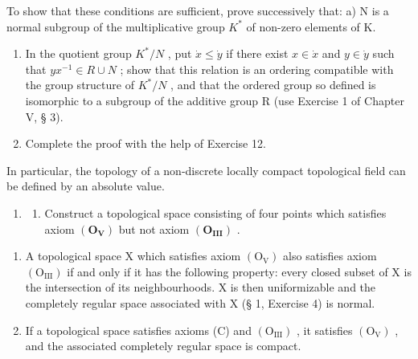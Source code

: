 To show that these conditions are sufficient, prove successively that: a) N is a normal subgroup of the multiplicative group \(K^{*}\) of non-zero elements of K.

\begin{enumerate}
\def\labelenumi{\alph{enumi})}
\setcounter{enumi}{1}
\item
  In the quotient group \(K^{*}/N\) , put \(\dot{x} \leqslant \dot{y}\) if there exist \(x \in \dot{x}\) and \(y \in \dot{y}\) such that \(yx^{-1} \in R \cup N\) ; show that this relation is an ordering compatible with the group structure of \(K^{*}/N\) , and that the ordered group so defined is isomorphic to a subgroup of the additive group R (use Exercise 1 of Chapter V, § 3).
\item
  Complete the proof with the help of Exercise 12.
\end{enumerate}

In particular, the topology of a non-discrete locally compact topological field can be defined by an absolute value.

\ExerciseSection

\begin{enumerate}
\def\labelenumi{\roman{enumi})}
\tightlist
\item
  \begin{enumerate}
  \def\labelenumii{\alph{enumii})}
  \tightlist
  \item
    Construct a topological space consisting of four points which satisfies axiom \((\mathbf{O}_{\mathbf{V}})\) but not axiom \((\mathbf{O}_{\mathbf{III}})\) .
  \end{enumerate}
\end{enumerate}

\begin{enumerate}
\def\labelenumi{\alph{enumi})}
\setcounter{enumi}{1}
\item
  A topological space X which satisfies axiom \((\mathrm{O}_{\mathrm{V}})\) also satisfies axiom \((\mathrm{O}_{\mathrm{III}})\) if and only if it has the following property: every closed subset of X is the intersection of its neighbourhoods. X is then uniformizable and the completely regular space associated with X (§ 1, Exercise 4) is normal.
\item
  If a topological space satisfies axioms (C) and \((\mathrm{O}_{\mathrm{III}})\) , it satisfies \((\mathrm{O}_{\mathrm{V}})\) , and the associated completely regular space is compact.
\end{enumerate}

